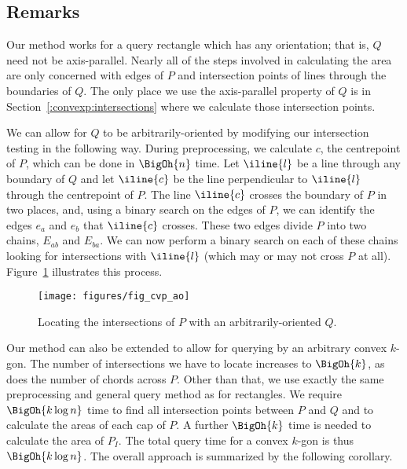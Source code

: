 \subsection{Remarks}
\label{:convexp:remarks}

Our method works for a query rectangle which has any orientation; that is, $Q$ need not be axis-parallel.
Nearly all of the steps involved in calculating the area are only concerned with edges of $P$ and intersection points of lines through the boundaries of $Q$.
The only place we use the axis-parallel property of $Q$ is in Section~\ref{:convexp:intersections} where we calculate those intersection points.

We can allow for $Q$ to be arbitrarily-oriented by modifying our intersection testing in the following way. 
During preprocessing, we calculate $c$, the centrepoint of $P$, which can be done in $\BigOh{n}$ time.
Let $\iline{l}$ be a line through any boundary of $Q$ and let $\iline{c}$ be the line perpendicular to $\iline{l}$ through the centrepoint of $P$.
The line $\iline{c}$ crosses the boundary of $P$ in two places, and, using a binary search on the edges of $P$, we can identify the edges $e_a$ and $e_b$ that $\iline{c}$ crosses.
These two edges divide $P$ into two chains, $E_{ab}$ and $E_{ba}$.
We can now perform a binary search on each of these chains looking for intersections with $\iline{l}$ (which may or may not cross $P$ at all).
Figure~\ref{fig:convexp:ao} illustrates this process.

\begin{figure}[t]
\begin{center}
  \texttt{[image: figures/fig\_cvp\_ao]}
  \caption{Locating the intersections of $P$ with an arbitrarily-oriented $Q$.}
  \label{fig:convexp:ao}
\end{center}
\end{figure}

Our method can also be extended to allow for querying by an arbitrary convex $k$-gon.
The number of intersections we have to locate increases to $\BigOh{k}$, as does the number of chords across $P$.
Other than that, we use exactly the same preprocessing and general query method as for rectangles. 
We require $\BigOh{k \log{n}}$ time to find all intersection points between $P$ and $Q$ and to calculate the areas of each cap of $P$. A further $\BigOh{k}$ time is needed to calculate the area of $P_I$. 
The total query time for a convex $k$-gon is thus $\BigOh{k \log{n}}$.
The overall approach is summarized by the following corollary.

